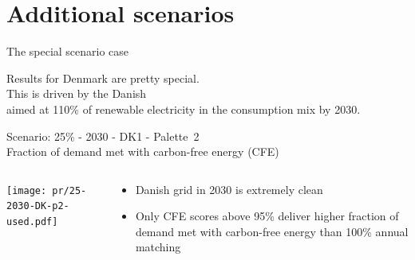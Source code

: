 \section{Additional scenarios}


\begin{frame}{The special scenario case}
\centering

Results for Denmark are pretty special. \\
This is driven by the Danish  \\ 
aimed at 110\% of renewable electricity in the consumption mix by 2030.

\end{frame}


\begin{frame}{Scenario: 25\% - 2030 - DK1 - Palette~2
\\ Fraction of demand met with carbon-free energy (CFE)}

\begin{columns}[T]
\begin{column}{9cm}
\centering

\texttt{[image: pr/25-2030-DK-p2-used.pdf]}
\end{column}
\begin{column}{5cm}

\begin{itemize}
  \item Danish grid in 2030 is \alert{extremely clean}
  \item Only \alert{CFE scores above 95\%} deliver higher fraction of demand met with carbon-free energy than 100\% annual matching
\end{itemize}
  
\end{column}
\end{columns}

\end{frame}


